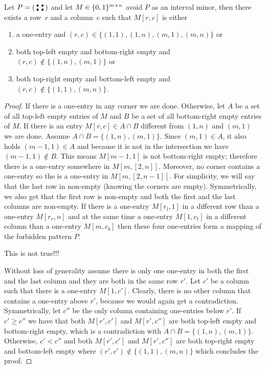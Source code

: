 \begin{lemma}
\label{lemma1}
Let $P=\left(\begin{smallmatrix}\bullet&\bullet\\\bullet&\bullet\end{smallmatrix}\right)$ and let $M\in\{0,1\}^{m\times n}$ avoid $P$ as an interval minor, then there exists a row~$r$ and a column~$c$ such that $M[r,c]$ is either
\begin{enumerate}
\item a one-entry and $(r,c)\in\{(1,1),(1,n),(m,1),(m,n)\}$ or
\item both top-left empty and bottom-right empty and $(r,c)\not\in\{(1,n),(m,1)\}$ or
\item both top-right empty and bottom-left empty and $(r,c)\not\in\{(1,1),(m,n)\}$.
\end{enumerate}
\end{lemma}
\begin{proof}
If there is a one-entry in any corner we are done. Otherwise, let $A$ be a set of all top-left empty entries of $M$ and $B$ be a set of all bottom-right empty entries of $M$. If there is an entry $M[r,c]\in A\cap B$ different from $(1,n)$ and $(m,1)$ we are done. Assume $A\cap B=\{(1,n),(m,1)\}$. Since $(m,1)\in A$, it also holds $(m-1,1)\in A$ and because it is not in the intersection we have $(m-1,1)\not\in B$. This means $M[m-1,1]$ is not bottom-right empty; therefore there is a one-entry somewhere in $M[{m},[2,n]]$. Moreover, no corner contains a one-entry so the is a one-entry in $M[{m},[2,n-1]]$. For simplicity, we will say that the last row in non-empty (knowing the corners are empty). Symmetrically, we also get that the first row is non-empty and both the first and the last columns are non-empty. If there is a one-entry $M[r_l,1]$ in a different row than a one-entry $M[r_r,n]$ and at the same time a one-entry $M[1,c_t]$ in a different column than a one-entry $M[m,c_b]$ then these four one-entries form a mapping of the forbidden pattern $P$.

This is not true!!!

Without loss of generality assume there is only one one-entry in both the first and the last column and they are both in the same row $r'$. Let $c'$ be a column such that there is a one-entry $M[1,c']$. Clearly, there is no other column that contains a one-entry above $r'$, because we would again get a contradiction. Symmetrically, let $c''$ be the only column containing one-entries below $r'$. If $c'\geq c''$ we have that both $M[r',c']$ and $M[r',c'']$ are both top-left empty and bottom-right empty, which is a contradiction with $A\cap B=\{(1,n),(m,1)\}$. Otherwise, $c'<c''$ and both $M[r',c']$ and $M[r',c'']$ are both top-right empty and bottom-left empty where $(r',c')\not\in\{(1,1),(m,n)\}$ which concludes the proof.
\end{proof}

